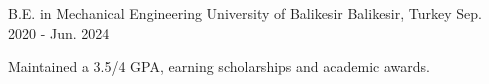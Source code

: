 

\begin{cventries}

\cventry
  {B.E. in Mechanical Engineering} %
  {University of Balikesir} %
  {Balikesir, Turkey} %
  {Sep. 2020 - Jun. 2024} %
  {
    \begin{cvitems} %
      \item {Maintained a 3.5/4 GPA, earning scholarships and academic awards.}
    \end{cvitems}
  }

\end{cventries}
